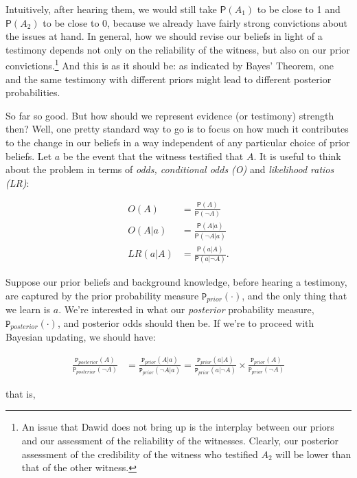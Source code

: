 \documentclass[10pt,dvipsnames,enabledeprecatedfontcommands]{scrartcl}
\newcommand{\n}{\neg}
\newcommand{\pr}[1]{\mathsf{P}(#1)}
\newcommand{\prr}[1]{\mbox{$\mathtt{P}_{prior}(#1)$}}
\newcommand{\prp}[1]{\mbox{$\mathtt{P}_{posterior}(#1)$}}
\begin{document}
\noindent     Intuitively, after hearing them, we would still take
\(\pr{A_1}\) to be close to 1 and \(\pr{A_2}\) to be close to 0, because
we already have fairly strong convictions about the issues at hand. In
general, how we should revise our beliefs in light of a testimony
depends not only on the reliability of the witness, but also on our
prior
convictions.\footnote{An issue that Dawid does not bring up is the interplay between our priors and our assessment of the reliability of the witnesses. Clearly, our posterior assessment of the credibility of the witness who testified $A_2$ will be lower than that of the other witness.}
And this is as it should be: as indicated by Bayes' Theorem, one and the
same testimony with different priors might lead to different posterior
probabilities.

So far so good. But how should we represent evidence (or testimony)
strength then? Well, one pretty standard way to go is to focus on how
much it contributes to the change in our beliefs in a way independent of
any particular choice of prior beliefs. Let \(a\) be the event that the
witness testified that \(A\). It is useful to think about the problem in
terms of \emph{odds, conditional odds (O)} and
\emph{likelihood ratios (LR)}:

\begin{align*} O(A)  & = \frac{\pr{A}}{\pr{\n A}}\\
 O(A\vert a) &= \frac{\pr{A\vert a}}{\pr{\n A \vert a}}  \\
 LR(a\vert A) &= \frac{\pr{a\vert A}}{\pr{a\vert \n A}}. 
\end{align*}

Suppose our prior beliefs and background knowledge, before hearing a
testimony, are captured by the prior probability measure
\(\prr{\cdot}\), and the only thing that we learn is \(a\). We're
interested in what our \emph{posterior} probability measure,
\(\prp{\cdot}\), and posterior odds should then be. If we're to proceed
with Bayesian updating, we should have:

\vspace{-6mm}

\begin{align*}
 \frac{\prp{A}}{\prp{\n A}} & = \frac{\prr{A\vert a}}{\prr{\n A\vert a}}
 =
 \frac{\prr{a\vert A}}{\prr{a\vert \n A}}
 \times
 \frac{\prr{A}}{\prr{\n A}}
  \end{align*}

that is,

\vspace{-6mm}
\end{document}
